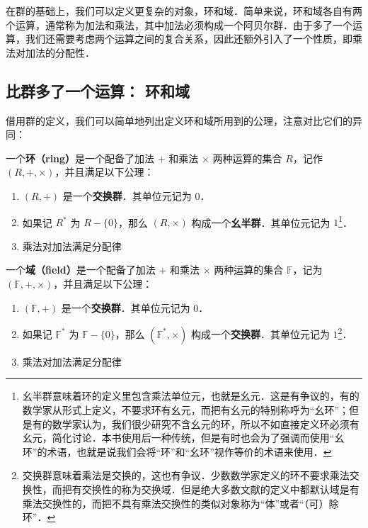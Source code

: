 

在群的基础上，我们可以定义更复杂的对象，环和域．简单来说，环和域各自有两个运算，通常称为加法和乘法，其中加法必须构成一个阿贝尔群．由于多了一个运算，我们还需要考虑两个运算之间的复合关系，因此还额外引入了一个性质，即乘法对加法的分配性．

\subsection{比群多了一个运算： 环和域}

借用群的定义，我们可以简单地列出定义环和域所用到的公理，注意对比它们的异同：

\begin{definition}{}
一个\textbf{环（ring）}是一个配备了加法 $+$ 和乘法 $\times$ 两种运算的集合 $R$，记作 $(R, +, \times)$，并且满足以下公理：
\begin{enumerate}
    \item $(R, +)$ 是一个\textbf{交换群}．其单位元记为 $0$．
    \item 如果记 $R^*$ 为 $R-\{0\}$，那么 $(R, \times)$ 构成一个\textbf{幺半群}．其单位元记为 $1$\footnote{幺半群意味着环的定义里包含乘法单位元，也就是幺元．这是有争议的，有的数学家从形式上定义，不要求环有幺元，而把有幺元的特别称呼为“幺环”；但是有的数学家认为，我们很少研究不含幺元的环，所以不如直接定义环必须有幺元，简化讨论．本书使用后一种传统，但是有时也会为了强调而使用“幺环”的术语，也就是说我们会将“环”和“幺环”视作等价的术语来使用．}．
    \item 乘法对加法满足分配律
\end{enumerate}
\end{definition}

\begin{definition}{}
一个\textbf{域（field）}是一个配备了加法 $+$ 和乘法 $\times$ 两种运算的集合 $\mathbb{F}$，记为 $(\mathbb{F}, +, \times)$，并且满足以下公理：

\begin{enumerate}
    \item $(\mathbb{F}, +)$ 是一个\textbf{交换群}．其单位元记为 $0$．
    \item 如果记 $\mathbb{F}^*$ 为 $\mathbb{F}-\{0\}$，那么 $(\mathbb{F}^*, \times)$ 构成一个\textbf{交换群}．其单位元记为 $1$\footnote{交换群意味着乘法是交换的，这也有争议．少数数学家定义的环不要求乘法交换性，而把有交换性的称为交换域．但是绝大多数文献的定义中都默认域是有乘法交换性的，而把不具有乘法交换性的类似对象称为“体”或者“（可）除环”．}．
    \item 乘法对加法满足分配律
\end{enumerate}
\end{definition}


